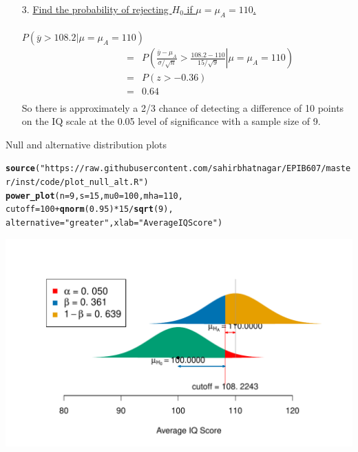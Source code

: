 \documentclass[10pt]{beamer}\usepackage[]{graphicx}\usepackage[]{color}
\makeatletter
\def\maxwidth{ %
  \ifdim\Gin@nat@width>\linewidth
    \linewidth
  \else
    \Gin@nat@width
  \fi
}
\newcommand{\hlnum}[1]{\textcolor[rgb]{0.686,0.059,0.569}{#1}}%
\newcommand{\hlstr}[1]{\textcolor[rgb]{0.192,0.494,0.8}{#1}}%
\newcommand{\hlopt}[1]{\textcolor[rgb]{0,0,0}{#1}}%
\newcommand{\hlstd}[1]{\textcolor[rgb]{0.345,0.345,0.345}{#1}}%
\newcommand{\hlkwc}[1]{\textcolor[rgb]{0.333,0.667,0.333}{#1}}%
\newcommand{\hlkwd}[1]{\textcolor[rgb]{0.737,0.353,0.396}{\textbf{#1}}}%
\newenvironment{kframe}{%
 \def\at@end@of@kframe{}%
 \ifinner\ifhmode%
  \def\at@end@of@kframe{\end{minipage}}%
  \begin{minipage}{\columnwidth}%
 \fi\fi%
 \def\FrameCommand##1{\hskip\@totalleftmargin \hskip-\fboxsep
 \colorbox{shadecolor}{##1}\hskip-\fboxsep
     \hskip-\linewidth \hskip-\@totalleftmargin \hskip\columnwidth}%
 \MakeFramed {\advance\hsize-\width
   \@totalleftmargin\z@ \linewidth\hsize
   \@setminipage}}%
 {\par\unskip\endMakeFramed%
 \at@end@of@kframe}
\newenvironment{knitrout}{}{} %
\makeatother
\begin{document}
{	\begin{enumerate}
		\item[3.] \underline{Find the probability of rejecting $H_0$ if
			$\mu=\mu_A=110$.}\\ \ \\
		$P(\overline{y} > 108.2|\mu=\mu_A=110) $
		\begin{eqnarray*} \qquad \qquad & = &
			P\left(\left.\frac{\overline{y}-\mu_A}{\sigma/\sqrt{n}}
			> \frac{108.2-110}{15/\sqrt{9}}\right|\mu=\mu_A=110\right)\\
			& = & P\left(z > -0.36\right)\\
			& = & 0.64\\
		\end{eqnarray*}
		So there is approximately a 2/3 chance of detecting a difference of
		10 points on the IQ scale at the 0.05 level of significance with a
		sample size of 9.
	\end{enumerate}
} 


\begin{frame}[fragile]{Null and alternative distribution plots}
\begin{knitrout}\tiny
{}\color{fgcolor}\begin{kframe}
\begin{alltt}
\hlkwd{source}\hlstd{(}\hlstr{"https://raw.githubusercontent.com/sahirbhatnagar/EPIB607/master/inst/code/plot_null_alt.R"}\hlstd{)}
\hlkwd{power_plot}\hlstd{(}\hlkwc{n} \hlstd{=} \hlnum{9}\hlstd{,} \hlkwc{s} \hlstd{=} \hlnum{15}\hlstd{,} \hlkwc{mu0} \hlstd{=} \hlnum{100}\hlstd{,} \hlkwc{mha} \hlstd{=} \hlnum{110}\hlstd{,}
\hlkwc{cutoff} \hlstd{=} \hlnum{100} \hlopt{+} \hlkwd{qnorm}\hlstd{(}\hlnum{0.95}\hlstd{)} \hlopt{*} \hlnum{15} \hlopt{/} \hlkwd{sqrt}\hlstd{(}\hlnum{9}\hlstd{),}
\hlkwc{alternative} \hlstd{=} \hlstr{"greater"}\hlstd{,} \hlkwc{xlab} \hlstd{=} \hlstr{"Average IQ Score"}\hlstd{)}
\end{alltt}
\end{kframe}

{\centering \includegraphics[width=\maxwidth]{figure/unnamed-chunk-18-1} 

}


\end{knitrout}
\end{frame}
\end{document}
